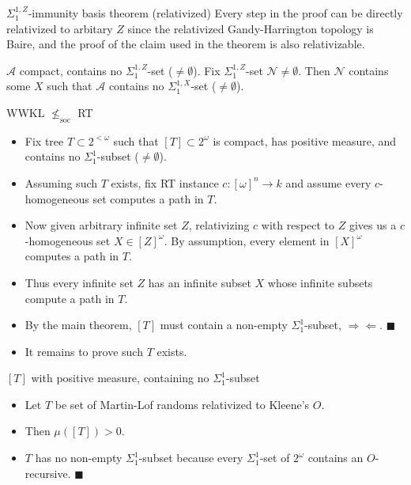 \begin{frame}{$\Sigma_1^{1,Z}$-immunity basis theorem (relativized)}
  Every step in the proof can be directly relativized to arbitary $Z$ since
  the relativized Gandy-Harrington topology is Baire, and the proof of the
  claim used in the theorem is also relativizable.

  \vspace{0.5em}
  \begin{immunity*}[Relativized]
    $\mathcal{A}$ compact, contains no $\Sigma_1^{1,Z}$-set
    ($\neq\emptyset$). Fix $\Sigma_1^{1,Z}$-set
    $\mathcal{N}\neq\emptyset$. Then $\mathcal{N}$ contains some $X$ such
    that $\mathcal{A}$ contains no $\Sigma_1^{1,X}$-set ($\neq\emptyset$).
  \end{immunity*}
\end{frame}

\begin{frame}{WWKL $\nleq_{\text{soc}}$ RT}
  \begin{itemize}
    \item Fix tree $T\subset 2^{<\omega}$ such that
      $[T]\subset 2^\omega$ is compact, has positive measure, and
      contains no $\Sigma_1^1$-subset ($\neq\emptyset$).
    \item Assuming such $T$ exists, fix RT instance
      $c:[\omega]^n\rightarrow k$ and assume every $c$-homogeneous set
      computes a path in $T$.
    \item Now given arbitrary infinite set $Z$, relativizing $c$ with
      respect to $Z$ gives us a $c$-homogeneous set $X\in[Z]^\omega$.
      By assumption, every element in $[X]^\omega$ computes a path in $T$.
    \item Thus every infinite set $Z$ has an infinite subset $X$ whose
      infinite subsets compute a path in $T$.
    \item By the main theorem, $[T]$ must contain a
      non-empty $\Sigma_1^1$-subset, $\Rightarrow\Leftarrow$.
      $\blacksquare$
    \item It remains to prove such $T$ exists.
  \end{itemize}
\end{frame}

\begin{frame}{$[T]$ with positive measure, containing no
$\Sigma_1^1$-subset}
  \begin{itemize}
    \item Let $T$ be set of Martin-Lof randoms relativized to Kleene's $O$.
    \item Then $\mu([T])>0$.
    \item $T$ has no non-empty $\Sigma_1^1$-subset because every
      $\Sigma_1^1$-set of $2^\omega$ contains an $O$-recursive.
      $\blacksquare$
  \end{itemize}
\end{frame}
